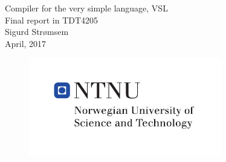 


\begin{titlepage}
    \centering
    {\LARGE Compiler for the very simple language, VSL} \\[0.5cm]
    {\Large Final report in TDT4205}\\
    \vspace{1.5cm}
    {\large Sigurd Strømsem}\\
    \vspace{.5cm}
    April, 2017
    \begin{figure}[b]
        \centering
        \includegraphics[width=0.75\textwidth]{fig/hovedlogo_eng.pdf}\\
    \end{figure}
\thispagestyle{empty}
\end{titlepage}

\clearpage
\setcounter{page}{1}
\setlength{\parskip}{1em}
\renewcommand{\baselinestretch}{1.25}









